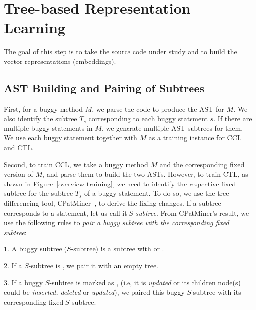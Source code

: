 \section{Tree-based Representation Learning}


The goal of this step is to take the source code under study and to
build the vector representations (embeddings).

\subsection{AST Building and Pairing of Subtrees}

First, for a buggy method $M$, we
parse the code to produce the AST for $M$. We also identify the
subtree $T_s$ corresponding to each buggy statement $s$. If there are
multiple buggy statements in $M$, we generate multiple AST subtrees
for them.  We use each buggy statement together with $M$
as a training instance for CCL and CTL.

Second, to train CCL, we take a buggy method $M$ and the corresponding
fixed version of $M$, and parse them to build the two ASTs.
%
However, to train CTL, as shown in Figure~\ref{overview-training}, we
need to identify the respective fixed subtree for the subtree $T_s$ of
a buggy statement. To do so, we use the tree differencing tool,
CPatMiner~\cite{nguyen2019graph}, to derive the fixing changes. If a
subtree corresponds to a statement, let us call it {\em
  S-subtree}. From CPatMiner's result, we use the following rules to
{\em pair a buggy subtree with the corresponding fixed subtree}:

1. A buggy subtree ($S$-subtree) is a subtree with
 or .

2. If a $S$-subtree is , we pair it with an empty tree.

3. If a buggy $S$-subtree is marked as , (i.e, it is
{\em updated} or its children node(s) could be {\em inserted, deleted} or {\em
  updated}), we paired this buggy $S$-subtree with its corresponding
fixed $S$-subtree.

